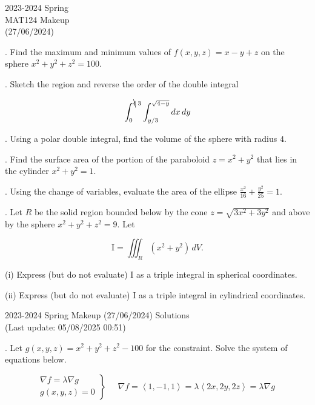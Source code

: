 \documentclass{article}
\begin{document}
\pagestyle{empty}
\large

\begin{center}
2023-2024 Spring \\MAT124 Makeup\\(27/06/2024)
\end{center}

. Find the maximum and minimum values of $f(x,y,z)=x-y+z$ on the sphere $x^2+y^2+z^2=100$.

\hfill

. Sketch the region and reverse the order of the double integral

\[\int_0^{\bcancel4\:3}\int_{y/3}^{\sqrt{4-y}}dx\,dy\]

\hfill

. Using a polar double integral, find the volume of the sphere with radius $4$.

\hfill

. Find the surface area of the portion of the paraboloid $z=x^2+y^2$ that lies in the cylinder $x^2+y^2=1$.

\hfill

. Using the change of variables, evaluate the area of the ellipse $\displaystyle\frac{x^2}{16}+\frac{y^2}{25}=1$.

\hfill

. Let $R$ be the solid region bounded below by the cone $z=\sqrt{3x^2+3y^2}$ and above by the sphere $x^2+y^2+z^2=9$. Let

\[\mathrm{I}=\iiint_R(x^2+y^2)\,dV.\]

\hfill

\noindent (i) Express (but do not evaluate) $\mathrm{I}$ as a triple integral in spherical coordinates.

\hfill

\noindent (ii) Express (but do not evaluate) $\mathrm{I}$ as a triple integral in cylindrical coordinates.

\newpage

\begin{center}
2023-2024 Spring Makeup (27/06/2024) Solutions\\
(Last update: 05/08/2025 00:51)
\end{center}

. Let $g(x,y,z)=x^2+y^2+z^2-100$ for the constraint. Solve the system of equations below.

\[
\left.
\begin{array}{l}
\displaystyle\nabla f=\lambda\nabla g \\
\displaystyle g(x,y,z)=0
\end{array}
\right\}\quad
\begin{array}{c}
\nabla f=\left\langle1,-1,1\right\rangle=\lambda\left\langle2x,2y,2z\right\rangle=\lambda\nabla g
\end{array}
\]
\end{document}
